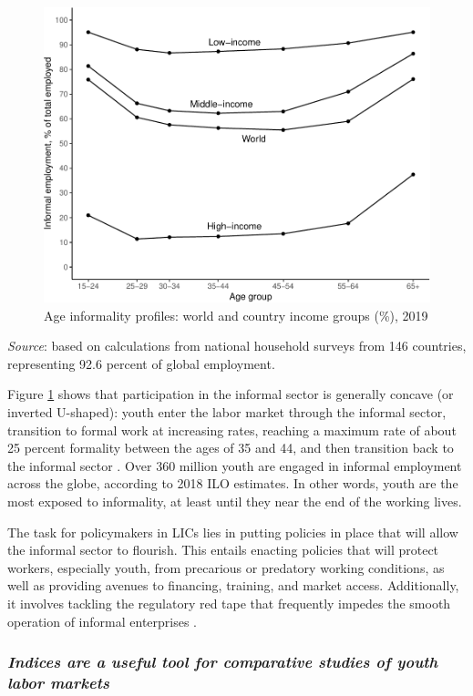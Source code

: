 \documentclass[
  a4paper, twoside, 12pt]{book}
\begin{document}
\begin{figure}[H]
\includegraphics[width=0.8\linewidth,]{figures/fig-inf-1} \caption{Age informality profiles: world and country income groups (\%), 2019}\label{fig:fig-inf}
\end{figure}

\footnotesize

\noindent \emph{Source}: \textcite{ilo2023a} based on calculations from national household surveys from 146 countries, representing 92.6 percent of global employment.
\normalsize
\hfill\break

Figure \ref{fig:fig-inf} shows that participation in the informal sector is generally concave (or inverted U-shaped): youth enter the labor market through the informal sector, transition to formal work at increasing rates, reaching a maximum rate of about 25 percent formality between the ages of 35 and 44, and then transition back to the informal sector \autocite{chacaltana2019}. Over 360 million youth are engaged in informal employment across the globe, according to 2018 ILO estimates. In other words, youth are the most exposed to informality, at least until they near the end of the working lives.

The task for policymakers in LICs lies in putting policies in place that will allow the informal sector to flourish. This entails enacting policies that will protect workers, especially youth, from precarious or predatory working conditions, as well as providing avenues to financing, training, and market access. Additionally, it involves tackling the regulatory red tape that frequently impedes the smooth operation of informal enterprises \autocite{imf2017}.

\hypertarget{indices-are-a-useful-tool-for-comparative-studies-of-youth-labor-markets}{%
\subsubsection*{\texorpdfstring{\emph{Indices are a useful tool for comparative studies of youth labor markets}}{Indices are a useful tool for comparative studies of youth labor markets}}\label{indices-are-a-useful-tool-for-comparative-studies-of-youth-labor-markets}}
\end{document}
